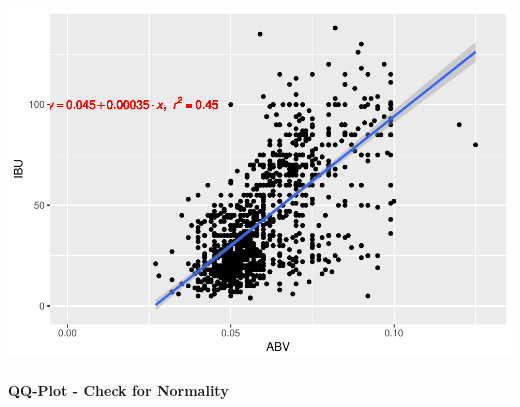 \documentclass[]{article}
\let\oldparagraph\paragraph
\renewcommand{\paragraph}[1]{\oldparagraph{#1}\mbox{}}
\begin{document}
\includegraphics{Analysis_Final_files/figure-latex/unnamed-chunk-14-1.pdf}

\paragraph{QQ-Plot - Check for
Normality}\label{qq-plot---check-for-normality}
\end{document}
